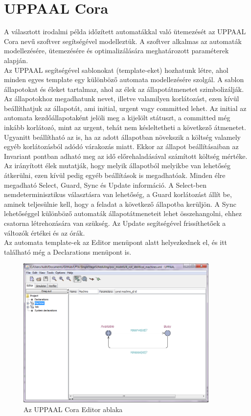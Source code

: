 \documentclass [12pt]{report}
\begin{document}
\section{UPPAAL Cora}
A választott irodalmi példa időzített automatákkal való ütemezését az UPPAAL Cora nevű szoftver segítségével modelleztük. A szoftver alkalmas az automaták modellezésére, ütemezésére és optimalizálására meghatározott paraméterek alapján. \\
Az UPPAAL segítségével sablonokat (template-eket) hozhatunk létre, ahol minden egyes template egy különböző automata modellezésére szolgál. A sablon állapotokat és éleket tartalmaz, ahol az élek az állapotátmenetet szimbolizálják. \\
Az állapotokhoz megadhatunk nevet, illetve valamilyen korlátozást, ezen kívül beállíthatjuk az állapotát, ami initial, urgent vagy committed lehet. Az initial az automata kezdőállapotaként jelöli meg a kijelölt státuszt, a committed még inkább korlátozó, mint az urgent, tehát nem késleltetheti a következő átmenetet. Ugyanitt beállítható az is, ha az adott állapotban növekszik a költség valamely egyéb korlátozásból adódó várakozás miatt. Ekkor az állapot beállításaiban az Invariant pontban adható meg az idő előrehaladásával számított költség mértéke. \\
Az irányított élek mutatják, hogy melyik állapotból melyikbe van lehetőség átkerülni, ezen kívül pedig egyéb beállítások is megadhatóak. Minden élre megadható  Select, Guard, Sync és Update információ. A Select-ben nemdeterminisztikus választásra van lehetőség, a Guard korlátozást állít be, aminek teljesülnie kell, hogy a feladat a következő állapotba kerüljön. A Sync lehetőséggel különböző automaták állapotátmeneteit lehet összehangolni, ehhez csatorna létrehozására van szükség. Az Update segítségével frissíthetőek a változók értékei és az órák.\\
Az automata template-ek az Editor menüpont alatt helyezkednek el, és itt található még a Declarations menüpont is. 
\begin{figure}
\begin{center}
\includegraphics[width=10cm]{uppaal2}
 \caption{Az UPPAAL Cora Editor ablaka}
\end{center}
\end{figure}
\end{document}
